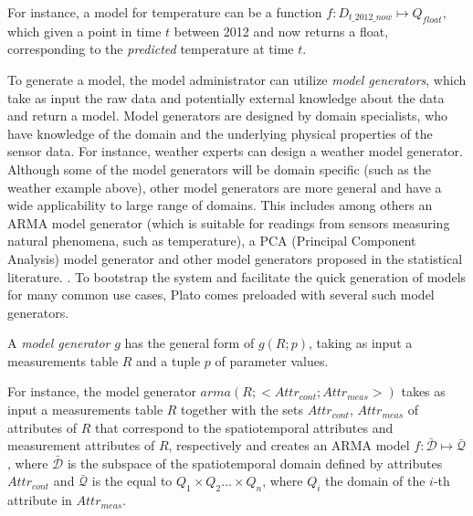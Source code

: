 \vspace*{0.5cm}
\begin{example}
For instance, a model for temperature can be a function $f:D_{t\_2012\_now}\mapsto Q_{float}$, which given a point in time $t$ between 2012 and now returns a float, corresponding to the \emph{predicted} temperature at time $t$.
\end{example}
\vspace*{0.5cm}

To generate a model, the model administrator can utilize {\em model generators}, which take as input the raw data and potentially external knowledge about the data and return a model. Model generators are designed by domain specialists, who have knowledge of the domain and the underlying physical properties of the sensor data. For instance, weather experts can design a weather model generator. Although some of the model generators will be domain specific (such as the weather example above), other model generators are more general and have a wide applicability to large range of domains. This includes among others an ARMA model generator (which is suitable for readings from sensors measuring natural phenomena, such as temperature), a PCA (Principal Component Analysis) model generator and other model generators proposed in the statistical literature. . To bootstrap the system and facilitate the quick generation of models for many common use cases, Plato comes preloaded with several such model generators.

A {\em model generator} $g$ has the general form of $g(R;p)$, taking as input a measurements table $R$ and a tuple $p$ of parameter values.

\vspace*{0.5cm}
\begin{example}
For instance, the model generator $arma(R;<Attr_{cont}; Attr_{meas}>)$ takes as input a measurements table $R$ together with the sets $Attr_{cont}$, $Attr_{meas}$ of attributes of $R$ that correspond to the spatiotemporal attributes and measurement attributes of $R$, respectively and creates an ARMA model $f:\mathcal{\bar{D}}\mapsto\mathcal{\bar{Q}}$, where $\mathcal{\bar{D}}$ is the subspace of the spatiotemporal domain defined by attributes $Attr_{cont}$ and $\mathcal{\bar{Q}}$ is the equal to $Q_1 \times Q_2 \ldots \times Q_n$, where $Q_i$ the domain of the $i$-th attribute in $Attr_{meas}$. 
\end{example}  
\vspace*{0.5cm}


